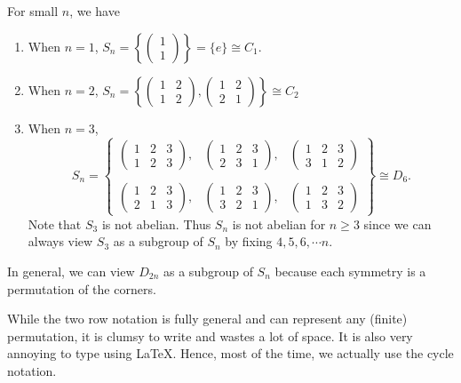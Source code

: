 \documentclass[a4paper]{article}
\begin{document}
\begin{eg}
  For small $n$, we have
  \begin{enumerate}
    \item When $n = 1$, $S_n = \left\{\begin{pmatrix}1\\1\end{pmatrix}\right\} = \{e\}\cong C_1$.
    \item When $n = 2$, $S_n = \left\{\begin{pmatrix}1 & 2\\ 1 & 2\end{pmatrix}, \begin{pmatrix}1 & 2\\2 & 1\end{pmatrix}\right\}\cong C_2$
    \item When $n = 3$,
      \[
        S_n = \left\{\begin{matrix}\begin{pmatrix}1 & 2 & 3\\1 & 2 & 3\end{pmatrix}, &\begin{pmatrix}1 & 2 & 3\\ 2 & 3 & 1\end{pmatrix}, &\begin{pmatrix}1 & 2 & 3\\3 & 1 & 2\end{pmatrix}\\\\\begin{pmatrix}1 & 2 & 3\\2 & 1 & 3\end{pmatrix}, &\begin{pmatrix}1 & 2 & 3\\ 3 & 2 & 1\end{pmatrix}, &\begin{pmatrix}1 & 2 & 3\\1 & 3 & 2\end{pmatrix}\end{matrix}\right\}\cong D_6.
      \]
      Note that $S_3$ is not abelian. Thus $S_n$ is not abelian for $n \geq 3$ since we can always view $S_3$ as a subgroup of $S_n$ by fixing $4, 5, 6, \cdots n$.
  \end{enumerate}
\end{eg}
In general, we can view $D_{2n}$ as a subgroup of $S_n$ because each symmetry is a permutation of the corners.

While the two row notation is fully general and can represent any (finite) permutation, it is clumsy to write and wastes a lot of space. It is also very annoying to type using \LaTeX. Hence, most of the time, we actually use the cycle notation.
\end{document}
